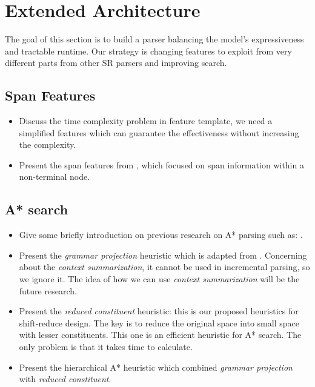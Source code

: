 \section{Extended Architecture}
	The goal of this section is to build a parser balancing the model's expressiveness and tractable runtime. Our strategy is changing features to exploit from very different parts from other SR parsers and improving search.
\subsection{Span Features}
	\begin{itemize}
		\item Discuss the time complexity problem in feature template, we need a simplified features which can guarantee the effectiveness without increasing the complexity.
		\item Present the span features from \cite{2014David}, which focused on span information within a non-terminal node.
	\end{itemize}
\subsection{A* search}
	\begin{itemize}
		\item Give some briefly introduction on previous research on A* parsing such as: \cite{2003DanNAACL}.
		\item Present the \textit{grammar projection} heuristic which is adapted from \cite{2003DanACL}. Concerning about the \textit{context summarization}, it cannot be used in incremental parsing, so we ignore it. The idea of how we can use \textit{context summarization} will be the future research.
		\item Present the \textit{reduced constituent} heuristic: this is our proposed heuristics for shift-reduce design. The key is to reduce the original space into small space with lesser constituents. This one is an efficient heuristic for A* search. The only problem is that it takes time to calculate.
		\item Present the hierarchical A* heuristic which combined \textit{grammar projection} with \textit{reduced constituent}.
	\end{itemize}
